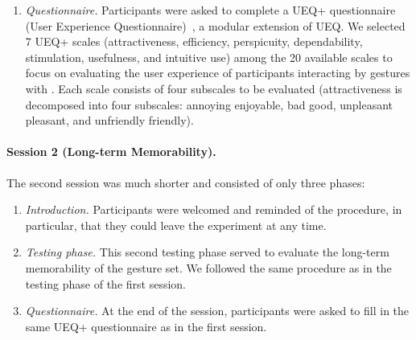 \begin{enumerate}
    \item \textit{Questionnaire.} Participants were asked to complete a UEQ+ questionnaire (User Experience Questionnaire)~\cite{Schrepp:2017}, a modular extension of UEQ. We selected 7 UEQ+ scales (\ie attractiveness, efficiency, perspicuity, dependability, stimulation, usefulness, and intuitive use) among the 20 available scales to focus on evaluating the user experience of participants interacting by gestures with \lui. Each scale consists of four subscales to be evaluated (\eg attractiveness is decomposed into four subscales: annoying \vs enjoyable, bad \vs good, unpleasant \vs pleasant, and unfriendly \vs friendly).
\end{enumerate}

\paragraph{Session 2 (Long-term Memorability).} The second session was much shorter and consisted of only three phases:
\begin{enumerate}
    \item \textit{Introduction.} Participants were welcomed and reminded of the procedure, in particular, that they could leave the experiment at any time.
    
    \item \textit{Testing phase.} This second testing phase served to evaluate the long-term memorability of the \lui gesture set. We followed the same procedure as in the testing phase of the first session.
    
    \item \textit{Questionnaire.} At the end of the session, participants were asked to fill in the same UEQ+ questionnaire as in the first session.
\end{enumerate}

